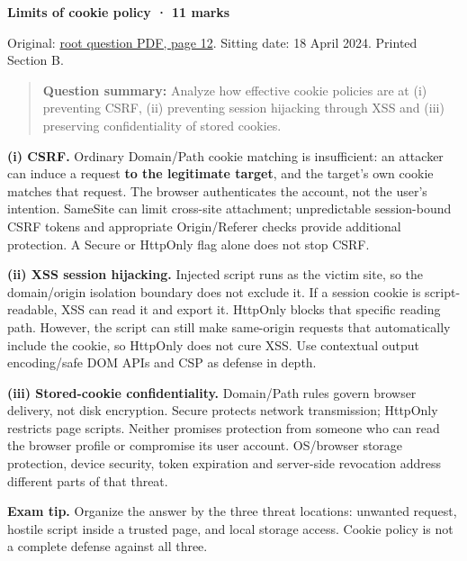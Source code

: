\documentclass[11pt,a4paper]{article}
\begin{document}
\textbf{Limits of cookie policy · 11 marks}


Original: \href{../../CSE405-Security_Merged.pdf\#page=12}{root question PDF,\allowbreak{} page 12}. Sitting date: 18 April 2024. Printed Section B.



\begin{quote}\small

\textbf{Question summary:} Analyze how effective cookie policies are at (i) preventing CSRF,\allowbreak{} (ii) preventing session hijacking through XSS and (iii) preserving confidentiality of stored cookies.



\end{quote}

\textbf{(i) CSRF.} Ordinary Domain/\allowbreak{}Path cookie matching is insufficient: an attacker can induce a request \textbf{to the legitimate target},\allowbreak{} and the target’s own cookie matches that request. The browser authenticates the account,\allowbreak{} not the user’s intention. SameSite can limit cross-site attachment; unpredictable session-bound CSRF tokens and appropriate Origin/\allowbreak{}Referer checks provide additional protection. A Secure or HttpOnly flag alone does not stop CSRF.


\textbf{(ii) XSS session hijacking.} Injected script runs as the victim site,\allowbreak{} so the domain/\allowbreak{}origin isolation boundary does not exclude it. If a session cookie is script-readable,\allowbreak{} XSS can read it and export it. HttpOnly blocks that specific reading path. However,\allowbreak{} the script can still make same-origin requests that automatically include the cookie,\allowbreak{} so HttpOnly does not cure XSS. Use contextual output encoding/\allowbreak{}safe DOM APIs and CSP as defense in depth.


\textbf{(iii) Stored-cookie confidentiality.} Domain/\allowbreak{}Path rules govern browser delivery,\allowbreak{} not disk encryption. Secure protects network transmission; HttpOnly restricts page scripts. Neither promises protection from someone who can read the browser profile or compromise its user account. OS/\allowbreak{}browser storage protection,\allowbreak{} device security,\allowbreak{} token expiration and server-side revocation address different parts of that threat.



{\color{ForestGreen}\textbf{Exam tip.} Organize the answer by the three threat locations: unwanted request,\allowbreak{} hostile script inside a trusted page,\allowbreak{} and local storage access. Cookie policy is not a complete defense against all three.}
\end{document}
